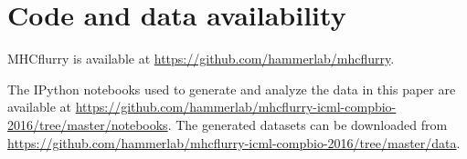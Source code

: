 \section{Code and data availability}
MHCflurry is available at \href{https://github.com/hammerlab/mhcflurry}{https://github.com/hammerlab/mhcflurry}.

The IPython\cite{Perez_2007} notebooks used to generate and analyze the data in this paper are available at \href{https://github.com/hammerlab/mhcflurry-icml-compbio-2016/tree/master/notebooks}{https://github.com/hammerlab/mhcflurry-icml-compbio-2016/tree/master/notebooks}. The generated datasets can be downloaded from \href{https://github.com/hammerlab/mhcflurry-icml-compbio-2016/tree/master/data}{https://github.com/hammerlab/mhcflurry-icml-compbio-2016/tree/master/data}.

